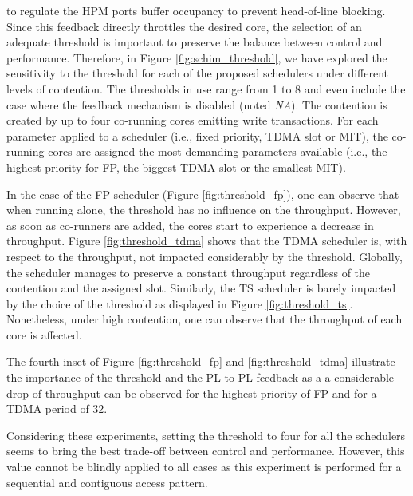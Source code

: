 \schim to regulate the HPM ports buffer occupancy to prevent head-of-line blocking.
Since this feedback directly throttles the desired core, the selection of an adequate
threshold is important to preserve the balance between control and performance.
Therefore, in Figure \ref{fig:schim_threshold}, we have explored the sensitivity
to the threshold for each of the proposed schedulers under different levels of contention.
The thresholds in use range from 1 to 8 and even include the case where the feedback mechanism is disabled
(noted \emph{NA}). The contention is created by up to four co-running cores emitting
write transactions. For each parameter applied to a scheduler (i.e., fixed
priority, TDMA slot or MIT), the co-running cores are assigned the most
demanding parameters available (i.e., the highest priority for FP, the biggest TDMA
slot or the smallest MIT).

In the case of the FP scheduler (Figure \ref{fig:threshold_fp}), one can observe
that when running alone, the threshold has no influence on the throughput.
However, as soon as co-runners are added, the cores start to experience a
decrease in throughput.
Figure \ref{fig:threshold_tdma} shows that the TDMA scheduler is, with respect to the throughput, not impacted considerably by the threshold. Globally, the
scheduler manages to preserve a constant throughput regardless of the contention
and the assigned slot.
Similarly, the TS scheduler is barely impacted by the choice of the threshold as
displayed in Figure \ref{fig:threshold_ts}. Nonetheless, under high
contention, one can observe that the throughput of each core is affected.

The fourth inset of Figure \ref{fig:threshold_fp} and \ref{fig:threshold_tdma}
illustrate the importance of the threshold and the PL-to-PL feedback as a
a considerable drop of throughput can be observed for the highest priority of FP
and for a TDMA period of 32.

Considering these experiments, setting the threshold to four for all the schedulers
seems to bring the best trade-off between control and performance. However, this
value cannot be blindly applied to all cases as this experiment is performed for
a sequential and contiguous access pattern.

